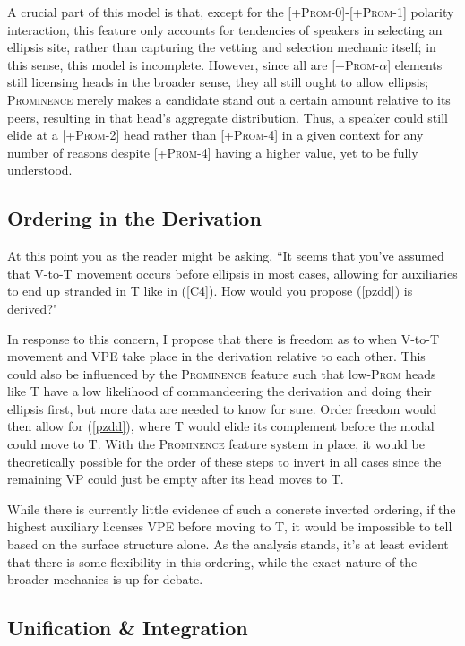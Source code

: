 \documentclass[11pt, oneside]{article}
\begin{document}
A crucial part of this model is that, except for the [+\textsc{Prom-0}]-[+\textsc{Prom-1}] polarity interaction, this feature only accounts for tendencies of speakers in selecting an ellipsis site, rather than capturing the vetting and selection mechanic itself; in this sense, this model is incomplete. However, since all are [+\textsc{Prom}-$\alpha$] elements still licensing heads in the broader sense, they all still ought to allow ellipsis; \textsc{Prominence} merely makes a candidate stand out a certain amount relative to its peers, resulting in that head's aggregate distribution. Thus, a speaker could still elide at a [+\textsc{Prom-2}] head rather than [+\textsc{Prom-4}] in a given context for any number of reasons despite [+\textsc{Prom-4}] having a higher value, yet to be fully understood.

\subsection{Ordering in the Derivation}\label{SecOrder}

At this point you as the reader might be asking, ``It seems that you've assumed that V-to-T movement occurs before ellipsis in most cases, allowing for auxiliaries to end up stranded in T like in (\ref{C4}). How would you propose (\ref{pzdd}) is derived?"

In response to this concern, I propose that there is freedom as to when V-to-T movement and VPE take place in the derivation relative to each other. This could also be influenced by the \textsc{Prominence} feature such that low-\textsc{Prom} heads like T have a low likelihood of commandeering the derivation and doing their ellipsis first, but more data are needed to know for sure. Order freedom would then allow for (\ref{pzdd}), where T would elide its complement before the modal could move to T. With the \textsc{Prominence} feature system in place, it would be theoretically possible for the order of these steps to invert in all cases since the remaining VP could just be empty after its head moves to T.

While there is currently little evidence of such a concrete inverted ordering, if the highest auxiliary licenses VPE before moving to T, it would be impossible to tell based on the surface structure alone. As the analysis stands, it's at least evident that there is some flexibility in this ordering, while the exact nature of the broader mechanics is up for debate.

\subsection{Unification \& Integration}\label{SecUni}
\end{document}
